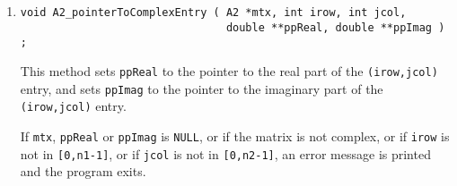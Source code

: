 \begin{enumerate}
or if {\tt irow} is not in {\tt [0,n1-1]},
or if {\tt jcol} is not in {\tt [0,n2-1]},
an error message is printed and the program exits.
\item
\begin{verbatim}
void A2_pointerToComplexEntry ( A2 *mtx, int irow, int jcol, 
                                double **ppReal, double **ppImag ) ;
\end{verbatim}
This method sets {\tt *ppReal} to the pointer to the real part
of the {\tt (irow,jcol)} entry,
and sets {\tt *ppImag} to the pointer to the imaginary part
of the {\tt (irow,jcol)} entry.
\par {}
If {\tt mtx}, {\tt ppReal} or {\tt ppImag} is {\tt NULL}, 
or if the matrix is not complex,
or if {\tt irow} is not in {\tt [0,n1-1]},
or if {\tt jcol} is not in {\tt [0,n2-1]},
an error message is printed and the program exits.
\end{enumerate}
\par
